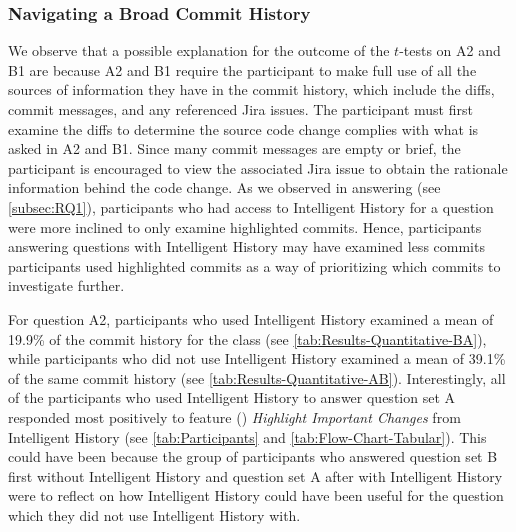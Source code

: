 \subsubsection{Navigating a Broad Commit History}

We observe that a possible explanation for the outcome of the $t$-tests on A2 and B1 are
because A2 and B1 require the participant to make full use of all the sources of
information they have in the commit history, which include the diffs, commit messages,
and any referenced Jira issues.
The participant must first examine the diffs to determine  the source code change
complies with what is asked in A2 and B1.
Since many commit messages are empty or brief, the participant is encouraged to view
the associated Jira issue to obtain the rationale information behind the code change.
As we observed in answering  (see \autoref{subsec:RQ1}), 
participants who had access to Intelligent History for a question
were more inclined to only examine highlighted commits.
Hence, participants answering questions with Intelligent History may have examined less commits
participants used highlighted commits as a way of prioritizing which commits to investigate further.

For question A2, participants who used Intelligent History examined a mean of 19.9\% of the commit history for the  class (see \autoref{tab:Results-Quantitative-BA}),
while participants who did not use Intelligent History examined a mean of 39.1\% of the same commit history (see \autoref{tab:Results-Quantitative-AB}). 
Interestingly, all of the participants who used Intelligent History to answer question set A 
responded most positively to feature () \textit{Highlight Important Changes} from Intelligent History  
(see \autoref{tab:Participants} and \autoref{tab:Flow-Chart-Tabular}).
This could have been because the group of participants who answered question set B first without Intelligent History 
and question set A after with Intelligent History were to reflect on how Intelligent History 
could have been useful for the question which they did not use Intelligent History with.


